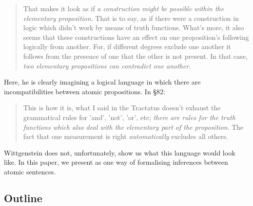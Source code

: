 \begin{quote}
  That makes it look as if \emph{a construction might be possible
    within the elementary proposition}. That is to say, as if there
  were a construction in logic which didn't work by means of truth
  functions.  What's more, it also seems that these constructions have
  an effect on one proposition's following logically from another.
  For, if different degrees exclude one another it follows from the
  presence of one that the other is not present.  In that case,
  \emph{two elementary propositions can contradict one another}.
\end{quote}

\NI Here, he is clearly imagining a logical language in which there
are incompatibilities between atomic propositions. In \S 82:

\begin{quote}
  This is how it is, what I said in the Tractatus doesn't exhaust the
  grammatical rules for 'and', 'not', 'or', etc; \emph{there are rules
    for the truth functions which also deal with the elementary part
    of the proposition}.  The fact that one measurement is right
  \emph{automatically} excludes all others.
\end{quote}

\NI Wittgenstein does not, unfortunately, show us what this
language would look like.  
In this paper, we present \cathoristic{} as one way of formalising inferences
between atomic sentences.

\subsection{Outline}

